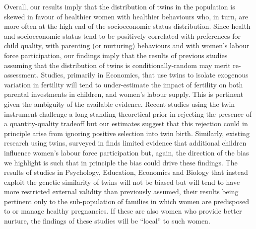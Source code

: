 \documentclass[11pt]{article}
\begin{document}
Overall, our results imply that the distribution of twins in the population is skewed in favour of healthier women with healthier behaviours who, in turn, are more often at the high end of the socioeconomic status distribution. Since health and socioeconomic status tend to be positively correlated with preferences for child quality, with parenting (or nurturing) behaviours %
and with women's labour force participation, our findings imply that the results of previous studies assuming that the distribution of twins is conditionally-random may merit re-assessment. 
Studies, primarily in Economics, that use twins to isolate exogenous variation in fertility will tend to under-estimate the impact of fertility on both parental investments in children, and women's labour supply. This is pertinent given the ambiguity of the available evidence. Recent studies using the twin instrument challenge a long-standing theoretical prior \cite{BeckerTomes1976} in rejecting the presence of a quantity-quality tradeoff \cite{Blacketal2005,Angristetal2010} but our estimates suggest that this rejection could in principle arise from ignoring positive selection into twin birth. Similarly, existing research using twins, surveyed in \cite{Lundborgetal2014} finds limited evidence that additional children influence women's labour force participation but, again, the direction of the bias we highlight is such that in principle the bias could drive these findings. The results of studies in Psychology, Education, Economics and Biology that instead exploit the genetic similarity of twins will not be biased but will tend to have more restricted external validity than previously assumed, their results being pertinent only to the sub-population of families in which women are predisposed to or manage healthy pregnancies. If these are also women who provide better nurture, the findings of these studies will be ``local'' to such women.
\end{document}
